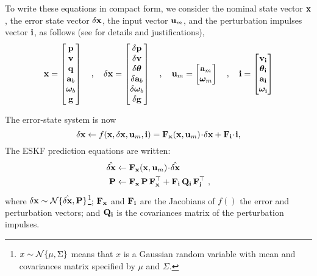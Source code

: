 To write these equations in compact form, we consider the nominal state vector ${\bf x}$, the error state vector $\delta{\bf x}$, the input vector ${\bf u}_m$, and the perturbation impulses vector ${\bf i}$, as follows (see  for details and justifications),
%
\begin{equation}
{\bf x}=\begin{bmatrix}{\bf p}\\{\bf v}\\{\bf q}\\{\bf a}_b\\{\bm \omega}_b\\{\bf g}\end{bmatrix} \quad, \quad
\delta{\bf x}=\begin{bmatrix}\delta{\bf p}\\\delta{\bf v}\\\delta{\bm \theta}\\\delta{\bf a}_b\\\delta{\bm \omega}_b\\\delta{\bf g}\end{bmatrix} \quad, \quad
{\bf u}_m = \begin{bmatrix}
{\bf a}_m \\
{\bm \omega}_m
\end{bmatrix} 
\quad,  \quad
{\bf i} = \begin{bmatrix}
{\bf v}_{\bf i} \\
{\bm \theta}_{\bf i} \\
{\bf a}_{\bf i} \\
{\bm \omega}_{\bf i}
\end{bmatrix}
\end{equation}


\bigskip
The error-state system is now
%
\begin{equation}
\delta{\bf x} \gets f({\bf x},\delta{\bf x},{\bf u}_m,{\bf i})={\bf F}_{\bf x}({\bf x}, {\bf u}_m)\!\cdot\! \delta{\bf x}+{\bf F}_{\bf i}\!\cdot\!{\bf i},
\end{equation}
%
The ESKF prediction equations are written:
%
%
\begin{align}
\hat{\delta{\bf x}} &\gets {\bf F}_{\bf x}({\bf x}, {\bf u}_m)\!\cdot\! \hat{\delta{\bf x}} \label{equ:errorMeanPred} \\
{\bf P} &\gets {\bf F}_{\bf x}\,{\bf P}\,{\bf F}_{\bf x}^{\top} + {\bf F}_{\bf i}\,{\bf Q}_{\bf i}\,{\bf F}_{\bf i}^{\top} \label{equ:errorCovPred} ~,
\end{align}%
%
where $\delta{\bf x}\sim\mathcal{N}\{\hat{\delta{\bf x}},{\bf P}\}$\footnote{$x\sim\mathcal{N}\{\mu,\Sigma\}$ means that $x$ is a Gaussian random variable with mean and covariances matrix specified by $\mu$ and $\Sigma$.}; ${\bf F}_{\bf x}$ and ${\bf F}_{\bf i}$ are the Jacobians of $f()$ \wrt the error and perturbation vectors; and ${\bf Q}_{\bf i}$ is the covariances matrix of the perturbation impulses. 

